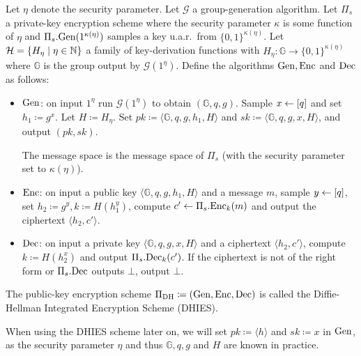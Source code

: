 \begin{definition}
	Let $\eta$ denote the security parameter. Let $\mathcal{G}$ a group-generation algorithm. Let $\Pi_s$ a private-key encryption scheme where the security parameter $\kappa$ is some function of $\eta$ and $\Pi_s.\mathrm{Gen}(1^{\kappa(\eta)})$ samples a key u.a.r.\ from $\{0, 1\}^{\kappa(\eta)}$. Let $\mathcal{H} = \{ H_{\eta} \mid \eta \in \mathbb{N} \}$ a family of key-derivation functions with $H_{\eta} \colon \mathbb{G} \to \{0, 1\}^{\kappa(\eta)}$ where $\mathbb{G}$ is the group output by $\mathcal{G}(1^\eta)$. Define the algorithms $\mathrm{Gen}, \mathrm{Enc}$ and $\mathrm{Dec}$ as follows:
	\begin{itemize}
		\item $\mathrm{Gen}$: on input $1^\eta$ run $\mathcal{G}(1^\eta)$ to obtain $(\mathbb{G}, q, g)$. Sample $x \leftarrow [q]$ and set $h_1 \coloneqq g^x$. Let $H \coloneqq H_{\eta}$. Set $pk \coloneqq \langle \mathbb{G}, q, g, h_1, H \rangle$ and $sk \coloneqq \langle \mathbb{G}, q, g, x, H \rangle$, and output $(pk, sk)$.

		      The message space is the message space of $\Pi_s$ (with the security parameter set to $\kappa(\eta)$).
		\item $\mathrm{Enc}$: on input a public key $\langle \mathbb{G}, q, g, h_1, H \rangle$ and a message $m$, sample $y \leftarrow [q]$, set $h_2 \coloneqq g^y, k \coloneqq H(h_1^y)$, compute $c' \leftarrow \Pi_s.\mathrm{Enc}_k(m)$ and output the ciphertext $\langle h_2, c' \rangle$.
		\item $\mathrm{Dec}$: on input a private key $\langle \mathbb{G}, q, g, x, H \rangle$ and a ciphertext $\langle h_2, c' \rangle$, compute $k \coloneqq H(h_2^x)$ and output $\Pi_s.\mathrm{Dec}_k(c')$. If the ciphertext is not of the right form or $\Pi_s.\mathrm{Dec}$ outputs $\bot$, output $\bot$.
	\end{itemize}
	The public-key encryption scheme $\Pi_{\mathrm{DH}} \coloneqq (\mathrm{Gen}, \mathrm{Enc}, \mathrm{Dec})$ is called the Diffie-Hellman Integrated Encryption Scheme (DHIES).

	When using the DHIES scheme later on, we will set $pk \coloneqq \langle h \rangle$ and $sk \coloneqq x$ in $\mathrm{Gen}$, as the security parameter $\eta$ and thus $\mathbb{G}, q, g$ and $H$ are known in practice.
\end{definition}

